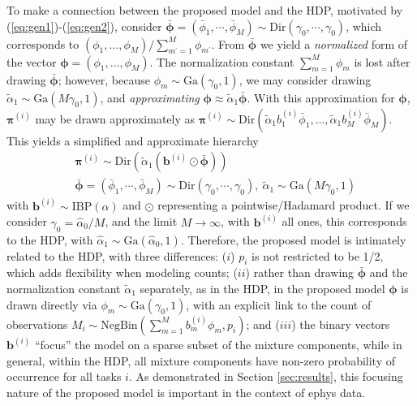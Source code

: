\documentclass[journal]{IEEEtran}
\newcommand{\beqs}{\begin{eqnarray}}
\newcommand{\eeqs}{\end{eqnarray}}
\newcommand{\bv}{\boldsymbol{b}}
\newcommand{\piv}{\boldsymbol{\pi}}
\newcommand{\phiv}{\boldsymbol{\phi}}
\begin{document}
To make a connection between the proposed model and the HDP, motivated by (\ref{eq:gen1})-(\ref{eq:gen2}), consider $\bar{\phiv}=(\bar{\phi}_1,\cdots,\bar{\phi}_M) \sim \mbox{Dir}(\gamma_0,\cdots,\gamma_0)$, which corresponds to $(\phi_1,\dots,\phi_M)/\sum_{m^\prime=1}^M \phi_{m^\prime}$. From $\bar{\phiv}$ we yield a \emph{normalized} form of the vector $\phiv=(\phi_1,\dots,\phi_M)$. The normalization constant $\sum_{m=1}^M\phi_m$ is lost after drawing $\bar{\phiv}$; however, because $\phi_m\sim\mbox{Ga}(\gamma_0,1)$, we may consider drawing $\tilde{\alpha}_1\sim\mbox{Ga}(M\gamma_0,1)$, and \emph{approximating} ${\phiv}\approx\tilde{\alpha}_1\bar{\phiv}$. With this approximation for $\phiv$, $\piv^{(i)}$ may be drawn approximately as $\piv^{(i)}\sim\mbox{Dir}(\tilde{\alpha}_1b_1^{(i)}\bar{\phi}_1,\dots,\tilde{\alpha}_1b_M^{(i)}\bar{\phi}_M)$. This yields a simplified and approximate hierarchy
\beqs & \piv^{(i)}\sim\mbox{Dir}(\tilde{\alpha}_1(\bv^{(i)}\odot\bar{\phiv}))\\ &\bar{\phiv}=(\bar{\phi}_1,\cdots,\bar{\phi}_M) \sim \mbox{Dir}(\gamma_0,\cdots,\gamma_0),~\tilde{\alpha}_1\sim\mbox{Ga}(M\gamma_0,1)\nonumber\eeqs
with $\bv^{(i)}\sim\mbox{IBP}(\alpha)$ and $\odot$ representing a pointwise/Hadamard product. If we consider $\gamma_0=\hat{\alpha}_0/M$, and the limit $M\rightarrow\infty$, with $\bv^{(i)}$ all ones, this corresponds to the HDP, with $\hat{\alpha}_1\sim\mbox{Ga}(\hat{\alpha}_0,1)$. Therefore, the proposed model is intimately related to the HDP, with three differences: ($i$) $p_i$ is not restricted to be 1/2, which adds flexibility when modeling counts; ($ii$) rather than drawing $\bar{\phiv}$ and the normalization constant $\tilde{\alpha}_1$ separately, as in the HDP, in the proposed model $\phiv$ is drawn directly via $\phi_m\sim\mbox{Ga}(\gamma_0,1)$, with an explicit link to the count of observations $M_i\sim\mbox{NegBin}(\sum_{m=1}^Mb_m^{(i)}\phi_m,p_i)$; and ($iii$) the binary vectors $\bv^{(i)}$ ``focus'' the model on a sparse subset of the mixture components, while in general, within the HDP, all mixture components have non-zero probability of occurrence for all tasks $i$. As demonstrated in Section \ref{sec:results}, this focusing nature of the proposed model is important in the context of ephys data.
\end{document}
